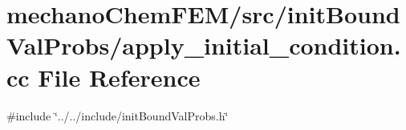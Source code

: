 \section{mechano\+Chem\+F\+E\+M/src/init\+Bound\+Val\+Probs/apply\+\_\+initial\+\_\+condition.cc File Reference}
\label{apply__initial__condition_8cc}
{\ttfamily \#include \char`\"{}../../include/init\+Bound\+Val\+Probs.\+h\char`\"{}}\newline

